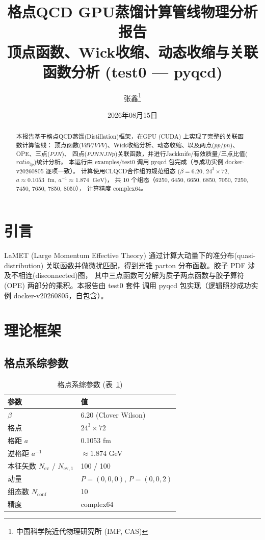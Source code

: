 \documentclass[11pt,a4paper]{article}
\title{\textbf{格点QCD GPU蒸馏计算管线物理分析报告}\\[0.3em]
       \large 顶点函数、Wick收缩、动态收缩与关联函数分析 (test0 — pyqcd)}
\author{张鑫\thanks{中国科学院近代物理研究所 (IMP, CAS)}}
\date{2026年08月15日}
\newcommand{\gev}{\;\mathrm{GeV}}
\newcommand{\fm}{\;\mathrm{fm}}
\newcommand{\Nconf}{N_{\mathrm{conf}}}
\newcommand{\Nev}{N_{\mathrm{ev}}}
\newcommand{\apm}{a^{-1}}
\begin{document}
\maketitle

\begin{abstract}
本报告基于格点QCD蒸馏(Distillation)框架，在GPU (CUDA) 上实现了完整的关联函数计算管线：
顶点函数($VdV$/$VVV$)、Wick收缩分析、动态收缩、以及两点($pp$/$pn$)、OPE、三点($PJN$)、
四点($PJNNJNp$)关联函数，并进行Jackknife/有效质量/三点比值($ratio_{3p}$)统计分析。
本运行由 examples/test0 调用 pyqcd 包完成（与成功实例 docker-v20260805 逐项一致）。
计算使用CLQCD合作组的规范组态
($\beta=6.20$, $24^3\times72$, $a\approx0.1053\;\fm$, $\apm\approx1.874\;\gev$)，
共 10 个组态（6250, 6450, 6650, 6850, 7050, 7250, 7450, 7650, 7850, 8050），
计算精度 complex64。
\end{abstract}

\tableofcontents
\newpage

\section{引言}
LaMET (Large Momentum Effective Theory) 通过计算大动量下的准分布(quasi-distribution)
关联函数并做微扰匹配，得到光锥 parton 分布函数。胶子 PDF 涉及不相连(disconnected)图，
其中三点函数可分解为质子两点函数与胶子算符 (OPE) 两部分的乘积。本报告由 test0 套件
调用 pyqcd 包实现（逻辑照抄成功实例 docker-v20260805，自包含）。

\section{理论框架}
\subsection{格点系综参数}
\begin{table}[h]
\centering
\caption{格点系综参数 (表~\ref{tab:ensemble})}
\label{tab:ensemble}
\begin{tabular}{ll}
\toprule
参数 & 值 \\
\midrule
$\beta$ & 6.20 (Clover Wilson) \\
格点 & $24^3\times72$ \\
格距 $a$ & 0.1053 fm \\
逆格距 $\apm$ & $\approx 1.874$ GeV \\
本征矢数 $\Nev$ / $N_{\mathrm{ev,1}}$ & 100 / 100 \\
动量 & $P=(0,0,0)$, $P=(0,0,2)$ \\
组态数 $\Nconf$ & 10 \\
精度 & complex64 \\
\bottomrule
\end{tabular}
\end{table}
\end{document}
